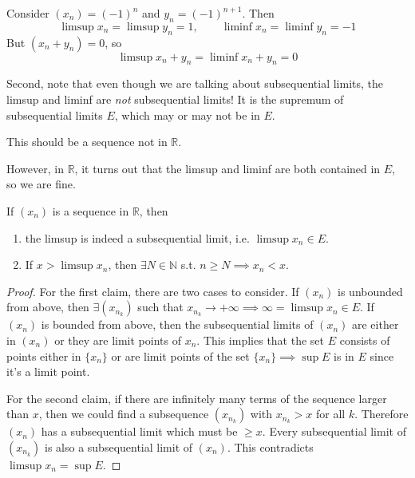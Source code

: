   \begin{example}
    Consider $(x_n) = (-1)^n$ and $y_n = (-1)^{n+1}$. Then 
    \begin{equation}
      \limsup x_n = \limsup y_n = 1, \qquad \liminf x_n = \liminf y_n = -1
    \end{equation}
    But $(x_n + y_n) = 0$, so 
    \begin{equation}
      \limsup x_n + y_n = \liminf x_n + y_n = 0 
    \end{equation}
  \end{example}

  Second, note that even though we are talking about subsequential limits, the limsup and liminf are \textit{not} subsequential limits! It is the supremum of subsequential limits $E$, which may or may not be in $E$. 

  \begin{example}
    This should be a sequence not in $\mathbb{R}$. 
  \end{example}

  However, in $\mathbb{R}$, it turns out that the limsup and liminf are both contained in $E$, so we are fine. 

  \begin{lemma} 
    If $(x_n)$ is a sequence in $\mathbb{R}$, then 
    \begin{enumerate}
      \item the limsup is indeed a subsequential limit, i.e. $\limsup x_n \in E$. 
      \item If $x > \limsup x_n$, then $\exists N \in \mathbb{N}$ s.t. $n \geq N \implies x_n < x$. 
    \end{enumerate}
  \end{lemma}
  \begin{proof}
    For the first claim, there are two cases to consider. If $(x_n)$ is unbounded from above, then $\exists (x_{n_k})$ such that $x_{n_k} \rightarrow +\infty \implies \infty = \limsup x_n \in E$. If $(x_n)$ is bounded from above, then the subsequential limits of $(x_n)$ are either in $(x_n)$ or they are limit points of $x_n$. This implies that the set $E$ consists of points either in $\{x_n\}$ or are limit points of the set $\{x_n\} \implies \sup{E}$ is in $E$ since it's a limit point. 

    For the second claim, if there are infinitely many terms of the sequence larger than $x$, then we could find a subsequence $(x_{n_k})$ with $x_{n_k} > x$ for all $k$. Therefore $(x_n)$ has a subsequential limit which must be $\geq x$. Every subsequential limit of $(x_{n_k})$ is also a subsequential limit of $(x_n)$. This contradicts $\limsup x_n = \sup E$. 
  \end{proof}

